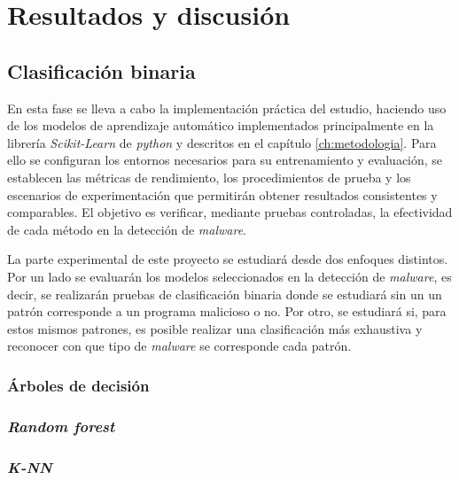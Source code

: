 \chapter{Resultados y discusión}
\label{ch:resultados}


\section{Clasificación binaria}
\label{sec:clas_binaria}

En esta fase se lleva a cabo la implementación práctica del estudio, haciendo uso de los modelos de aprendizaje automático implementados principalmente en la librería \textit{Scikit-Learn} de \textit{python} y descritos en el capítulo \ref{ch:metodologia}. Para ello se configuran los entornos necesarios para su entrenamiento y evaluación, se establecen las métricas de rendimiento, los procedimientos de prueba y los escenarios de experimentación que permitirán obtener resultados consistentes y comparables. El objetivo es verificar, mediante pruebas controladas, la efectividad de cada método en la detección de \textit{malware}.

La parte experimental de este proyecto se estudiará desde dos enfoques distintos. Por un lado se evaluarán los modelos seleccionados en la detección de \textit{malware}, es decir, se realizarán pruebas de clasificación binaria donde se estudiará sin un un patrón corresponde a un programa malicioso o no. Por otro, se estudiará si, para estos mismos patrones, es posible realizar una clasificación más exhaustiva y reconocer con que tipo de \textit{malware} se corresponde cada patrón.

\subsection{Árboles de decisión}
\label{subsec:dt_bin}



\subsection{\textit{Random forest}}
\label{subsec:rf_bin}



\subsection{\textit{K-NN}}
\label{subsec:knn_bin}

